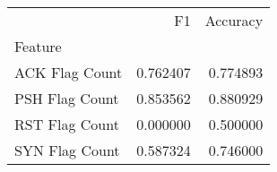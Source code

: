 \begin{tabular}{lrr}
\toprule
{} &        F1 &  Accuracy \\
Feature        &           &           \\
\midrule
ACK Flag Count &  0.762407 &  0.774893 \\
PSH Flag Count &  0.853562 &  0.880929 \\
RST Flag Count &  0.000000 &  0.500000 \\
SYN Flag Count &  0.587324 &  0.746000 \\
\bottomrule
\end{tabular}
